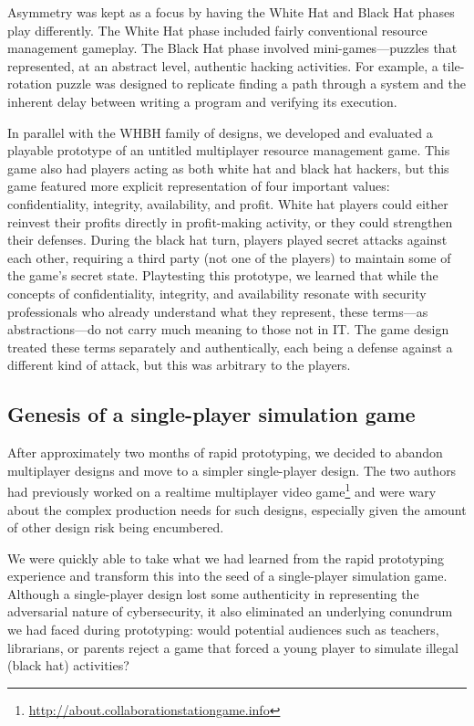 \documentclass[letterpaper]{article}
\begin{document}
Asymmetry was kept as a focus by having the White Hat and Black Hat
phases play differently. The White Hat phase included fairly conventional
resource management gameplay.
The Black Hat phase involved mini-games---puzzles that represented,
at an abstract level, authentic hacking activities.
For example, a tile-rotation puzzle was designed to replicate
finding a path through a system and the inherent delay between
writing a program and verifying its execution.

In parallel with the WHBH family of designs, we developed and evaluated 
a playable prototype of an untitled multiplayer resource management game.
This game also had players acting as both white hat and black hat hackers,
but this game featured more explicit representation of four
important values: confidentiality, integrity, availability, and profit.
White hat players could either reinvest their profits directly in
profit-making activity, or they could strengthen their defenses.
During the black hat turn, players played secret attacks against 
each other, requiring a third party (not one of the players) to maintain
some of the game's secret state.
Playtesting this prototype, we learned that 
while the concepts of confidentiality, integrity, and availability
resonate with security professionals who already understand what
they represent, these terms---as abstractions---do not carry much meaning
to those not in IT. 
The game design treated these terms separately and authentically,
each being a defense against a different kind of attack,
but this was arbitrary to the players.

\subsection{Genesis of a single-player simulation game}

After approximately two months of rapid prototyping, we decided
to abandon multiplayer designs and move to a simpler single-player
design. The two authors had previously worked on a realtime
multiplayer video 
game\footnote{\url{http://about.collaborationstationgame.info}} and
were wary about the complex production needs for such designs, especially
given the amount of other design risk being encumbered.

We were quickly able to take what we had learned from the rapid
prototyping experience and transform this into the seed of a single-player
simulation game.
Although a single-player design lost some authenticity in representing
the adversarial nature of cybersecurity, it also eliminated an underlying
conundrum we had faced during prototyping: would potential audiences
such as teachers, librarians, or parents 
reject a game that forced a young
player to simulate illegal (black hat) activities?
\end{document}
